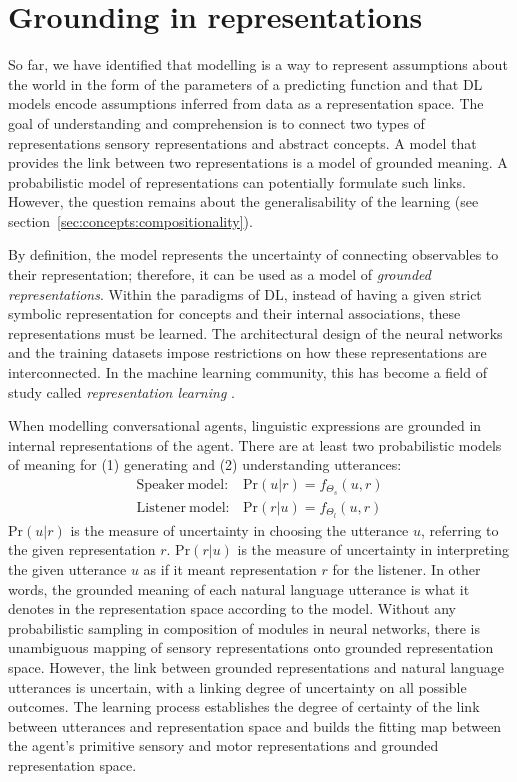 \section{Grounding in representations}
\label{sec:concepts:grounding}
So far, we have identified that modelling is a way to represent assumptions about the world in the form of the parameters of a predicting function and that DL models encode assumptions inferred from data as a representation space.
The goal of understanding and comprehension is to connect two types of representations \textemdash sensory representations and abstract concepts.
A model that provides the link between two representations is a model of grounded meaning. 
A probabilistic model of representations can potentially formulate such links. 
However, the question remains about the generalisability of the learning (see section~\ref{sec:concepts:compositionality}).

By definition, the model represents the uncertainty of connecting observables to their representation; therefore, it can be used as a model of \emph{grounded representations}. 
Within the paradigms of DL, instead of having a given strict symbolic representation for concepts and their internal associations, these representations must be learned. 
The architectural design of the neural networks and the training datasets impose restrictions on how these representations are interconnected. 
In the machine learning community, this has become a field of study called \emph{representation learning} \citep{bengio2013representation}. 

When modelling conversational agents, linguistic expressions are grounded in internal representations of the agent. There are at least two probabilistic models of meaning for (1) generating and (2) understanding utterances:
\begin{align}
\mathrm{Speaker~model}:& \mathrm{Pr}(u | r) = f_{\Theta_s}(u, r) \label{ch3:eq:utt}\\
\mathrm{Listener~model}:& \mathrm{Pr}(r | u) = f_{\Theta_l}(u, r)
\end{align}
\noindent $\mathrm{Pr}(u | r)$ is the measure of uncertainty in choosing the utterance  $u$, referring to the given representation  $r$. 
$\mathrm{Pr}(r | u)$ is the measure of uncertainty in interpreting the given utterance $u$ as if it meant representation $r$ for the listener. 
In other words, the grounded meaning of each natural language utterance is what it denotes in the representation space according to the model.
Without any probabilistic sampling in composition of modules in neural networks, there is unambiguous mapping of sensory representations onto grounded representation space. 
However, the link between grounded representations and natural language utterances is uncertain, with a linking degree of uncertainty on all possible outcomes. 
The learning process establishes the degree of certainty of the link between utterances and representation space and builds the fitting map between the agent’s primitive sensory and motor representations and grounded representation space. 

